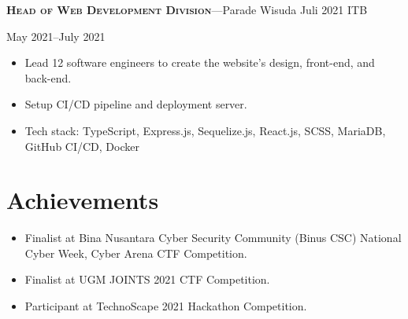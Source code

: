 \documentclass[10pt]{article}
\newcommand{\workExpVspace}{1em}
\newcommand{\orgExp}[5]{
    \noindent \textbf{\textsc{#1}}---#2

    {#3}--{#4}

    {#5}
    \vspace{\workExpVspace}
}
\begin{document}
\orgExp
{Head of Web Development Division}
{Parade Wisuda Juli 2021 ITB}
{May 2021}
{July 2021}
{
    \begin{itemize}
        \item Lead 12 software engineers to create the website's design, front-end, and back-end.
        \item Setup CI/CD pipeline and deployment server.
        \item Tech stack: TypeScript, Express.js, Sequelize.js, React.js, SCSS, MariaDB, GitHub
            CI/CD, Docker
    \end{itemize}
}

\section{Achievements}

\begin{itemize}
    \item Finalist at Bina Nusantara Cyber Security Community (Binus CSC)
        National Cyber Week, Cyber Arena CTF Competition.
    \item Finalist at UGM JOINTS 2021 CTF Competition.
    \item Participant at TechnoScape 2021 Hackathon Competition.
\end{itemize}
\end{document}
